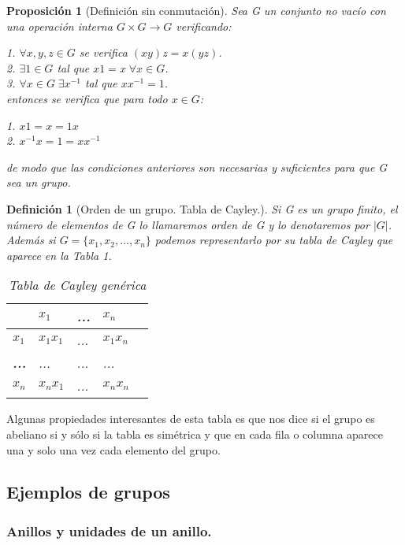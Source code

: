 \documentclass{article}
\theoremstyle{theorem-style}  %
\newtheorem{proposition}[theorem]{Proposición}
\theoremstyle{definition-style}
\newtheorem{definition}{Definición}[section]
\theoremstyle{example-style}
\begin{document}
\begin{proposition}[Definición sin conmutación]
Sea G un conjunto no vacío con una operación interna $G \times G \rightarrow G$ verificando:

1. $\forall x,y,z \in G$ se verifica $(xy)z = x(yz)$. \\
2. $\exists 1 \in G$ tal que $x1 = x \; \forall x \in G$. \\
3. $\forall x \in G \; \exists x^{-1}$ tal que $xx^{-1} = 1$. \\

entonces se verifica que para todo $x \in G$:

1. $x1 = x = 1x$ \\
2. $x^{-1}x = 1 = xx^{-1}$

de modo que las condiciones anteriores son necesarias y suficientes para que G sea un grupo.
\end{proposition}

\begin{definition}[Orden de un grupo. Tabla de Cayley.]
Si G es un grupo finito, el número de elementos de G lo llamaremos orden de G y lo denotaremos por $|G|$. Además si $G = \{x_1,x_2,...,x_n\}$ podemos representarlo por su tabla de Cayley que aparece en la Tabla 1.

\begin{table}
\centering
\caption{Tabla de Cayley genérica}
\begin{tabular}{l|llll}
 & \textbf{$x_1$} & \textbf{...} & \textbf{$x_n$} \\
\hline
\textbf{$x_1$} & $x_1 x_1$ & ... & $x_1 x_n$\\
\textbf{...} & ... & ... & ... \\
\textbf{$x_n$} & $x_n x_1$ & ... & $x_n x_n$\\
\end{tabular}
\end{table}
\end{definition}

Algunas propiedades interesantes de esta tabla es que nos dice si el grupo es abeliano si y sólo si la tabla es simétrica y que en cada fila o columna aparece una y solo una vez cada elemento del grupo.

\subsection{Ejemplos de grupos}

\subsubsection{Anillos y unidades de un anillo.}
\end{document}
